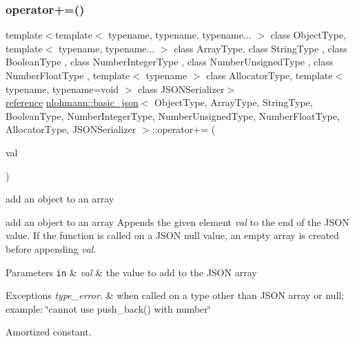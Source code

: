\subsubsection{\texorpdfstring{operator+=()}{operator+=()}\hspace{0.1cm}{\footnotesize\ttfamily [1/4]}}
{\footnotesize\ttfamily template$<$template$<$ typename, typename, typename... $>$ class Object\+Type, template$<$ typename, typename... $>$ class Array\+Type, class String\+Type , class Boolean\+Type , class Number\+Integer\+Type , class Number\+Unsigned\+Type , class Number\+Float\+Type , template$<$ typename $>$ class Allocator\+Type, template$<$ typename, typename=void $>$ class J\+S\+O\+N\+Serializer$>$ \\
\hyperlink{classnlohmann_1_1basic__json_ac6a5eddd156c776ac75ff54cfe54a5bc}{reference} \hyperlink{classnlohmann_1_1basic__json}{nlohmann\+::basic\+\_\+json}$<$ Object\+Type, Array\+Type, String\+Type, Boolean\+Type, Number\+Integer\+Type, Number\+Unsigned\+Type, Number\+Float\+Type, Allocator\+Type, J\+S\+O\+N\+Serializer $>$\+::operator+= (\begin{DoxyParamCaption}\item[{\hyperlink{classnlohmann_1_1basic__json}{basic\+\_\+json}$<$ Object\+Type, Array\+Type, String\+Type, Boolean\+Type, Number\+Integer\+Type, Number\+Unsigned\+Type, Number\+Float\+Type, Allocator\+Type, J\+S\+O\+N\+Serializer $>$ \&\&}]{val }\end{DoxyParamCaption})\hspace{0.3cm}{\ttfamily [inline]}}



add an object to an array 

add an object to an array Appends the given element {\itshape val} to the end of the J\+S\+ON value. If the function is called on a J\+S\+ON null value, an empty array is created before appending {\itshape val}.


\begin{DoxyParams}[1]{Parameters}
\mbox{\tt in}  & {\em val} & the value to add to the J\+S\+ON array\\
\hline
\end{DoxyParams}

\begin{DoxyExceptions}{Exceptions}
{\em type\+\_\+error.} & when called on a type other than J\+S\+ON array or null; example\+: {\ttfamily \char`\"{}cannot use push\+\_\+back() with number\char`\"{}}\\
\hline
\end{DoxyExceptions}
Amortized constant.

